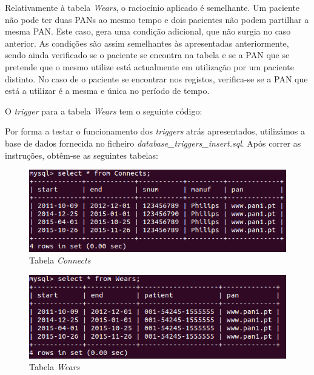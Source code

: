 \documentclass[a4paper]{article}
\begin{document}


Relativamente à tabela \textit{Wears}, o raciocínio aplicado é semelhante. Um paciente não pode ter duas PANs ao mesmo tempo e dois pacientes não podem partilhar a mesma PAN. Este caso, gera uma condição adicional, que não surgia no caso anterior. As condições são assim semelhantes às apresentadas anteriormente, sendo ainda verificado se o paciente se encontra na tabela e se a PAN que se pretende que o mesmo utilize está actualmente em utilização por um paciente distinto. No caso de o paciente se encontrar nos registos, verifica-se se a PAN que está a utilizar é a mesma e única no período de tempo.
\pagebreak

O \textit{trigger} para a tabela \textit{Wears} tem o seguinte código:
\vskip 5mm

\vskip 5mm
Por forma a testar o funcionamento dos \textit{triggers} atrás apresentados, utilizámos a base de dados fornecida no ficheiro \textit{database\_triggers\_insert.sql}. Após correr as instruções, obtêm-se as seguintes tabelas:

\begin{figure}[ht!]
\centering
\includegraphics[scale=0.7]{tabelas_insert_triggers_Connects.png}
\caption{Tabela \textit{Connects}}
\end{figure}

\begin{figure}[ht!]
\centering
\includegraphics[scale=0.7]{tabelas_insert_triggers_Wears.png}
\caption{Tabela \textit{Wears}}
\end{figure}
\end{document}

